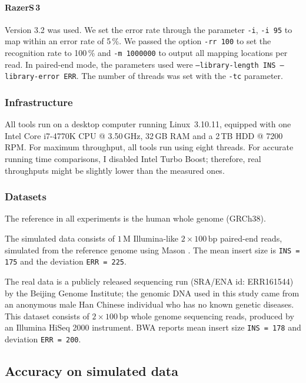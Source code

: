 \paragraph{RazerS\,3}
Version 3.2 was used.
We set the error rate through the parameter \texttt{-i}, \eg \texttt{-i 95} to map within an error rate of 5\,\%.
We passed the option \texttt{-rr 100} to set the recognition rate to 100\,\% and \texttt{-m 1000000} to output all mapping locations per read.
In paired-end mode, the parameters used were \texttt{--library-length INS --library-error ERR}.
The number of threads was set with the \texttt{-tc} parameter.

\subsubsection{Infrastructure}

All tools run on a desktop computer running Linux~3.10.11, equipped with one Intel Core i7-4770K CPU @ 3.50\,GHz, 32\,GB RAM and a 2\,TB HDD @ 7200\,RPM.
For maximum throughput, all tools run using eight threads.
For accurate running time comparisons, I disabled Intel Turbo Boost; therefore, real throughputs might be slightly lower than the measured ones.

\subsubsection{Datasets}

The reference in all experiments is the human whole genome (GRCh38).

The simulated data consists of $1\,\text{M}$ Illumina-like $2 \times 100\,\text{bp}$ paired-end reads, simulated from the reference genome using Mason \citep{SeqAnReadSimulator}.
The mean insert size is \texttt{INS = 175} and the deviation \texttt{ERR = 225}.

The real data is a publicly released sequencing run (SRA/ENA id: ERR161544) by the Beijing Genome Institute;
the genomic DNA used in this study came from an anonymous male Han Chinese individual who has no known genetic diseases.
This dataset consists of $2 \times 100\,\text{bp}$ whole genome sequencing reads, produced by an Illumina HiSeq 2000 instrument.
BWA reports mean insert size \texttt{INS = 178} and deviation \texttt{ERR = 200}.

\subsection{Accuracy on simulated data}

